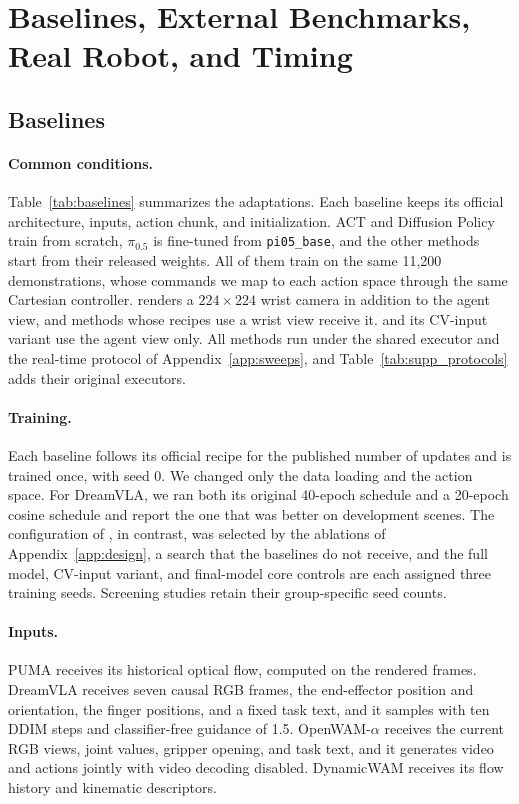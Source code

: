 \section{Baselines, External Benchmarks, Real Robot, and Timing}
\label{app:evaluation}

\subsection{Baselines}
\label{app:baselines}
\paragraph{Common conditions.} Table~\ref{tab:baselines} summarizes the adaptations.
Each baseline keeps its official architecture, inputs, action chunk, and
initialization. ACT and Diffusion Policy train from scratch, $\pi_{0.5}$ is
fine-tuned from \texttt{pi05\_base}, and the other methods start from their released
weights. All of them train on the same 11{,}200 demonstrations, whose commands we
map to each action space through the same Cartesian controller. \bench renders a
$224\times224$ wrist camera in addition to the agent view, and methods whose recipes
use a wrist view receive it. \ours and its CV-input variant use the agent view
only. All methods run under the shared executor and the real-time protocol of
Appendix~\ref{app:sweeps}, and Table~\ref{tab:supp_protocols} adds their original
executors.

\paragraph{Training.} Each baseline follows its official recipe for the published
number of updates and is trained once, with seed 0. We changed only the data
loading and the action space. For DreamVLA, we ran both its original 40-epoch
schedule and a 20-epoch cosine schedule and report the one that was better on
development scenes. The configuration of \ours, in contrast, was selected by the
ablations of Appendix~\ref{app:design}, a search that the baselines do not receive,
and the full model, CV-input variant, and final-model core controls are each
assigned three training seeds. Screening studies
retain their group-specific seed counts.

\paragraph{Inputs.} PUMA \cite{domino} receives its historical optical flow, computed
on the rendered frames. DreamVLA receives seven causal RGB frames, the end-effector
position and orientation, the finger positions, and a fixed task text, and it samples
with ten DDIM steps and classifier-free guidance of 1.5. OpenWAM-$\alpha$ receives
the current RGB views, joint values, gripper opening, and task text, and it generates
video and actions jointly with video decoding disabled. DynamicWAM receives its flow
history and kinematic descriptors.

